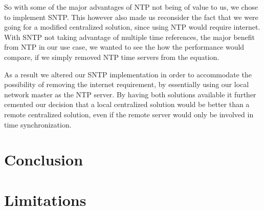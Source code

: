 
So with some of the major advantages of \ac{NTP} not being of value to us, we chose to implement \ac{SNTP}.
This however also made us reconsider the fact that we were going for a modified centralized solution, since using \ac{NTP} would require internet.
With \ac{SNTP} not taking advantage of multiple time references, the major benefit from \ac{NTP} in our use case, we wanted to see the how the performance would compare, if we simply removed \ac{NTP} time servers from the equation.

As a result we altered our \ac{SNTP} implementation in order to accommodate the possibility of removing the internet requirement, by essentially using our local network master as the \ac{NTP} server.
By having both solutions available it further cemented our decision that a local centralized solution would be better than a remote centralized solution, even if the remote server would only be involved in time synchronization.

\bigskip





\section{Conclusion}
\section{Limitations}

